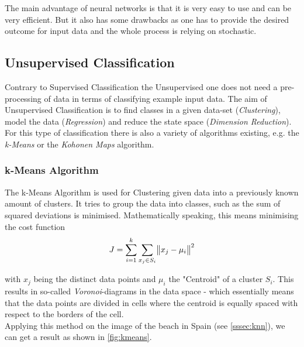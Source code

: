 The main advantage of neural networks is that it is very easy to use and can be very efficient. But it also has some drawbacks as one has to provide the desired outcome for input data and the whole process is relying on stochastic. 

\subsection{Unsupervised Classification}
Contrary to Supervised Classification the Unsupervised one does not need a pre-processing of data in terms of classifying example input data. The aim of Unsupervised Classification is to find classes in a given data-set (\textit{Clustering}), model the data (\textit{Regression}) and reduce the state space (\textit{Dimension Reduction}).\\
For this type of classification there is also a variety of algorithms existing, e.g. the \textit{k-Means} or the \textit{Kohonen Maps} algorithm.

\subsubsection{k-Means Algorithm} 

The k-Means Algorithm is used for Clustering given data into a previously known amount of clusters. It tries to group the data into classes, such as the sum of squared deviations is minimised. Mathematically speaking, this means minimising the cost function
\begin{equation*}
	\centering
	J = \sum_{i=1}^k \sum_{{x_j}\in{S_i}} \norm{x_j - \mu_i}^2
\end{equation*}

with $x_j$ being the distinct data points and $\mu_i$ the "Centroid" of a cluster $S_i$. This results in so-called \textit{Voronoi}-diagrams in the data space - which essentially means that the data points are divided in cells where the centroid is equally spaced with respect to the borders of the cell.\\
Applying this method on the image of the beach in Spain (see \cref{sssec:knn}), we can get a result as shown in \cref{fig:kmeans}.

